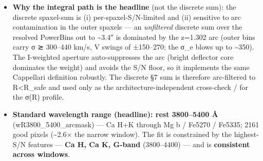 \documentclass[
]{article}
\newcommand{\BreakablePath}[1]{{\ttfamily\sloppy #1}}
\begin{document}
\begin{itemize}
  and \textbf{\(\sigma_e \equiv \sigma\)}, the fitted LOSVD dispersion.
  Because superposing spaxel spectra at different line-of-sight
  velocities \(V_i\) broadens the co-add, the width \(\sigma\) of that
  single fit \emph{equals} the luminosity-weighted second moment
  \(\sqrt{\langle (V_i-V_{\rm sys})^2 + \sigma_i^2\rangle}\) --- so it
  \textbf{measures} the Cappellari 2013 eq. 29 / Gültekin 2009 eq. 1
  quantity \textbf{without ever forming the explicit sum} (and with
  \(V_{\rm sys}\) absorbed automatically into the fitted \(V\); §2.4.1).
  Code:
  \BreakablePath{extract\_\discretionary{}{}{}aperture\_\discretionary{}{}{}spectrum}
  (the weighted sum) +
  \BreakablePath{bootstrap\_\discretionary{}{}{}ppxf.\discretionary{}{}{}setup\_\discretionary{}{}{}ppxf\_\discretionary{}{}{}inputs\_\discretionary{}{}{}from\_\discretionary{}{}{}spectrum}
  +
  \BreakablePath{ppxf(.\discretionary{}{}{}.\discretionary{}{}{}.\discretionary{}{}{}, moments=2)}.
  The explicit discrete sum \(\sum_j F_j(V_j^2+\sigma_j^2)/\sum_j F_j\)
  is computed \textbf{only} in the §7 annular cross-check
  (\BreakablePath{run\_\discretionary{}{}{}gultekin\_\discretionary{}{}{}mc}),
  never in the headline.
\item
  \textbf{Why the integral path is the headline} (not the discrete sum):
  the discrete spaxel-sum is (i) per-spaxel-S/N-limited and (ii)
  sensitive to arc contamination in the outer spaxels --- an
  \emph{unfiltered} discrete sum over the resolved PowerBins out to
  \textasciitilde3.4″ is dominated by the z=1.302 arc (outer bins carry
  σ ≳ 300--440 km/s, V swings of ±150--270; the σ\_e blows up to
  \textasciitilde350). The I-weighted aperture auto-suppresses the arc
  (bright deflector core dominates the weight) and avoids the S/N floor,
  so it implements the same Cappellari definition robustly. The discrete
  §7 sum is therefore arc-filtered to R\textless R\_safe and used only
  as the architecture-independent cross-check / for the σ(R) profile.
\item
  \textbf{Standard wavelength range (headline): rest 3800--5400 Å}
  (\BreakablePath{wR3800\_\discretionary{}{}{}5400\_\discretionary{}{}{}arcmask})
  --- Ca H+K through Mg b / Fe5270 / Fe5335; 2161 good pixels
  (\textasciitilde2.6× the narrow window). The fit is constrained by the
  highest-S/N features --- \textbf{Ca H, Ca K, G-band} (3800--4400) ---
  and is \textbf{consistent across windows}.


\end{itemize}
\end{document}
